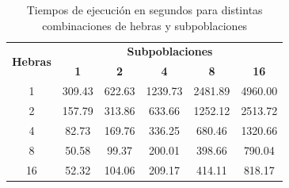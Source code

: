\begin{table}[ht]
    \centering
    \begin{tabular}{|c|ccccc|}
        \hline
        \multirow{2}{*}{\textbf{Hebras}} & \multicolumn{5}{c|}{\textbf{Subpoblaciones}}                                                      \\ \cline{2-6}
                                         & \textbf{1}                                   & \textbf{2} & \textbf{4} & \textbf{8} & \textbf{16} \\ \hline
        1                                & 309.43                                       & 622.63     & 1239.73    & 2481.89    & 4960.00     \\ \hline
        2                                & 157.79                                       & 313.86     & 633.66     & 1252.12    & 2513.72     \\ \hline
        4                                & 82.73                                        & 169.76     & 336.25     & 680.46     & 1320.66     \\ \hline
        8                                & 50.58                                        & 99.37      & 200.01     & 398.66     & 790.04      \\ \hline
        16                               & 52.32                                        & 104.06     & 209.17     & 414.11     & 818.17      \\ \hline
    \end{tabular}
    \caption{Tiempos de ejecución en segundos para distintas combinaciones de hebras y subpoblaciones}
    \label{tab:exploratory_subpopulations_times}
\end{table}

